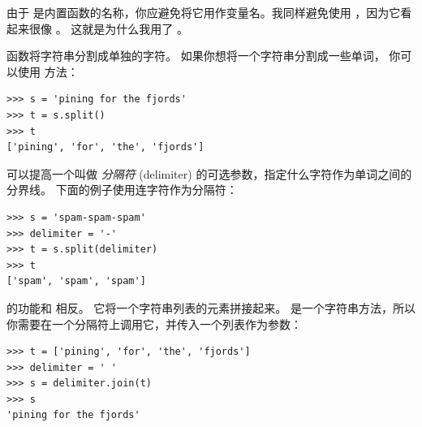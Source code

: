 %

由于  是内置函数的名称，你应避免将它用作变量名。我同样避免使用  ，因为它看起来很像 。 这就是为什么我用了  。


 函数将字符串分割成单独的字符。 如果你想将一个字符串分割成一些单词， 你可以使用  方法：

  

\begin{lstlisting}
>>> s = 'pining for the fjords'
>>> t = s.split()
>>> t
['pining', 'for', 'the', 'fjords']
\end{lstlisting}

%

可以提高一个叫做 {\em 分隔符} (delimiter) 的可选参数，指定什么字符作为单词之间的分界线。 下面的例子使用连字符作为分隔符：

  

\begin{lstlisting}
>>> s = 'spam-spam-spam'
>>> delimiter = '-'
>>> t = s.split(delimiter)
>>> t
['spam', 'spam', 'spam']
\end{lstlisting}

%

 的功能和  相反。 它将一个字符串列表的元素拼接起来。  是一个字符串方法，所以你需要在一个分隔符上调用它，并传入一个列表作为参数：

  

\begin{lstlisting}
>>> t = ['pining', 'for', 'the', 'fjords']
>>> delimiter = ' '
>>> s = delimiter.join(t)
>>> s
'pining for the fjords'
\end{lstlisting}

